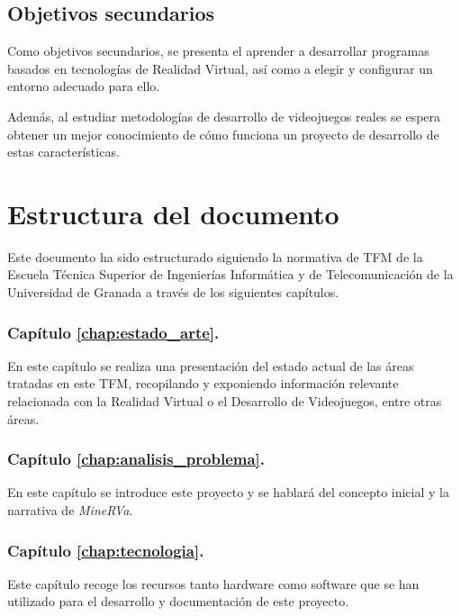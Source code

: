 \subsection{Objetivos secundarios}

Como objetivos secundarios, se presenta el aprender a desarrollar programas basados en tecnologías de Realidad Virtual, así como a elegir y configurar un entorno adecuado para ello.

Además, al estudiar metodologías de desarrollo de videojuegos reales se espera obtener un mejor conocimiento de cómo funciona un proyecto de desarrollo de estas características.

\section{Estructura del documento}

Este documento ha sido estructurado siguiendo la normativa de \acs{TFM} de la Escuela Técnica Superior de Ingenierías Informática y de Telecomunicación de la Universidad de Granada a través de los siguientes capítulos.

\subsubsection{Capítulo \ref{chap:estado_arte}. }

En este capítulo se realiza una presentación del estado actual de las áreas tratadas en este \acs{TFM}, recopilando y exponiendo información relevante relacionada con la Realidad Virtual o el Desarrollo de Videojuegos, entre otras áreas.

\subsubsection{Capítulo \ref{chap:analisis_problema}. }

En este capítulo se introduce este proyecto y se hablará del concepto inicial y la narrativa de \textit{MineRVa}.

\subsubsection{Capítulo \ref{chap:tecnologia}. }

Este capítulo recoge los recursos tanto hardware como software que se han utilizado para el desarrollo y documentación de este proyecto.

